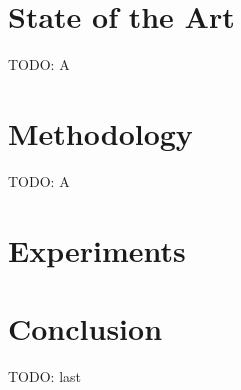 \documentclass{IOS-Book-Article}
\begin{document}
\section{State of the Art}
\label{sec:sota}

TODO: A



\section{Methodology}
\label{sec:method}

TODO: A



\section{Experiments}
\label{sec:experiments}



\section{Conclusion}

TODO: last





\end{document}
